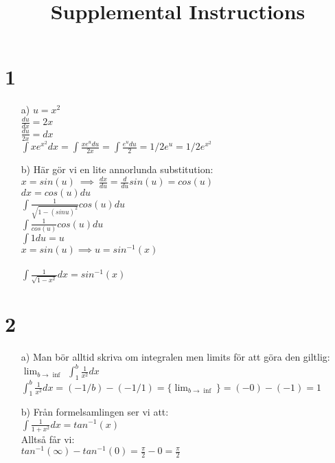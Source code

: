 \documentclass{article}
\title{Supplemental Instructions}
\date{
     }
\begin{document}
\maketitle

\section*{1}
\begin{itemize}
    \item[a) ] 	$u  = x^2$ \\ 
    			$\frac{du}{dx} = 2x$ \\
    			$\frac{du}{2x} = dx$ \\
    			$\int{ xe^{x^2} dx } = \int{\frac{ xe^{u} du}{2x} } = 
    			\int{\frac{ e^{u} du}{2} } = 1/2 e^u = 1/2 e^{x^2}$ \\
    			
    \item[b) ]  Här gör vi en lite annorlunda substitution: \\
    			$x = sin(u) \> \implies \> 
    			\frac{dx}{du} = \frac{d}{du} sin(u) = cos(u)$ \\
    			$dx = cos(u) du$ \\

    		  	$\int \frac{1}{\sqrt{1-(sin u)^2}} cos(u) du$ \\ 
    			$\int \frac{1}{cos(u)} cos(u) du$ \\ 
    			$\int 1 du = u$ \\ 
    			$x = sin(u) \implies u = sin^{-1}(x) $ \\ \\
    			$\int \frac{1}{\sqrt{1-x^2}} dx = sin^{-1}(x)$ 
    			
\end{itemize}

\section*{2}
\begin{itemize}
    \item[a) ]	Man bör alltid skriva om integralen men limits för att göra den 				giltlig: \\ 
				$\lim_{b \rightarrow \inf} \> \int_{1}^{b} \frac{1}{x^2} dx$ \\
    			$\int_{1}^{b} \frac{1}{x^2} dx = (- 1/b) - (- 1/1)
    			= \{  \lim_{b \rightarrow \inf} \} = (- 0) - (-1) = 1$ \\
    			
    			
    \item[b) ] 	Från formelsamlingen ser vi att: \\
    			$\int \frac{1}{1+x^2} dx = tan^{-1}(x)$ \\
    			Alltså får vi: \\
    			$tan^{-1}(\infty) - tan^{-1}(0) = \frac{\pi}{2} - 0 = \frac{\pi}{2}$
\end{itemize}
\end{document}
